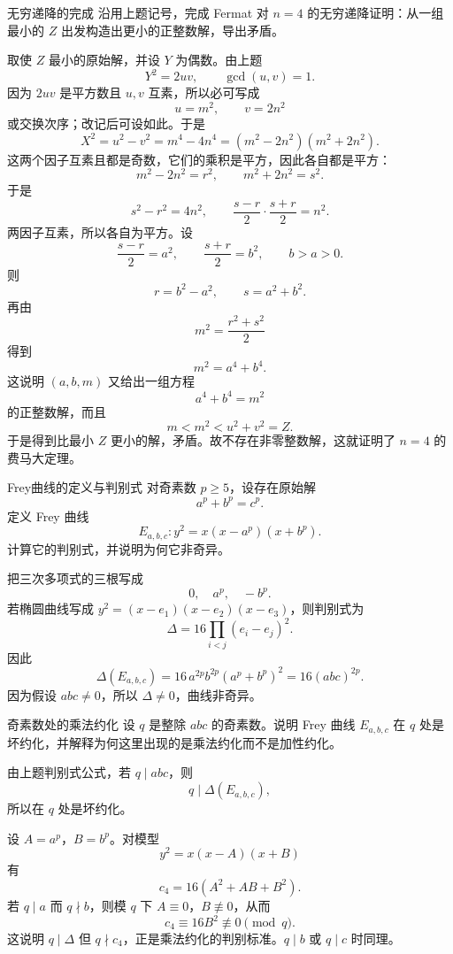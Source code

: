 \begin{problem}{无穷递降的完成}
\easy
沿用上题记号，完成 Fermat 对 $n=4$ 的无穷递降证明：从一组最小的 $Z$ 出发构造出更小的正整数解，导出矛盾。
\end{problem}
\begin{solution}
取使 $Z$ 最小的原始解，并设 $Y$ 为偶数。由上题
\[
Y^2=2uv,
\qquad \gcd(u,v)=1.
\]
因为 $2uv$ 是平方数且 $u,v$ 互素，所以必可写成
\[
u=m^2,
\qquad v=2n^2
\]
或交换次序；改记后可设如此。于是
\[
X^2=u^2-v^2=m^4-4n^4=(m^2-2n^2)(m^2+2n^2).
\]
这两个因子互素且都是奇数，它们的乘积是平方，因此各自都是平方：
\[
m^2-2n^2=r^2,
\qquad m^2+2n^2=s^2.
\]
于是
\[
s^2-r^2=4n^2,
\qquad
\frac{s-r}{2}\cdot \frac{s+r}{2}=n^2.
\]
两因子互素，所以各自为平方。设
\[
\frac{s-r}{2}=a^2,
\qquad
\frac{s+r}{2}=b^2,
\qquad b>a>0.
\]
则
\[
r=b^2-a^2,
\qquad s=a^2+b^2.
\]
再由
\[
m^2=\frac{r^2+s^2}{2}
\]
得到
\[
m^2=a^4+b^4.
\]
这说明 $(a,b,m)$ 又给出一组方程
\[
a^4+b^4=m^2
\]
的正整数解，而且
\[
m< m^2 < u^2+v^2=Z.
\]
于是得到比最小 $Z$ 更小的解，矛盾。故不存在非零整数解，这就证明了 $n=4$ 的费马大定理。
\end{solution}

\begin{problem}{Frey曲线的定义与判别式}
\easy
对奇素数 $p\ge5$，设存在原始解
\[
a^p+b^p=c^p.
\]
定义 Frey 曲线
\[
E_{a,b,c}:y^2=x(x-a^p)(x+b^p).
\]
计算它的判别式，并说明为何它非奇异。
\end{problem}
\begin{solution}
把三次多项式的三根写成
\[
0,\quad a^p,\quad -b^p.
\]
若椭圆曲线写成 $y^2=(x-e_1)(x-e_2)(x-e_3)$，则判别式为
\[
\Delta=16\prod_{i<j}(e_i-e_j)^2.
\]
因此
\[
\Delta(E_{a,b,c})=16\,a^{2p}b^{2p}(a^p+b^p)^{2}=16(a b c)^{2p}.
\]
因为假设 $abc\neq0$，所以 $\Delta\neq0$，曲线非奇异。
\end{solution}

\begin{problem}{奇素数处的乘法约化}
\easy
设 $q$ 是整除 $abc$ 的奇素数。说明 Frey 曲线 $E_{a,b,c}$ 在 $q$ 处是坏约化，并解释为何这里出现的是乘法约化而不是加性约化。
\end{problem}
\begin{solution}
由上题判别式公式，若 $q\mid abc$，则
\[
q\mid \Delta(E_{a,b,c}),
\]
所以在 $q$ 处是坏约化。

设 $A=a^p$，$B=b^p$。对模型
\[
y^2=x(x-A)(x+B)
\]
有
\[
c_4=16(A^2+AB+B^2).
\]
若 $q\mid a$ 而 $q\nmid b$，则模 $q$ 下 $A\equiv0$，$B\not\equiv0$，从而
\[
c_4\equiv16B^2\not\equiv0\pmod q.
\]
这说明 $q\mid\Delta$ 但 $q\nmid c_4$，正是乘法约化的判别标准。$q\mid b$ 或 $q\mid c$ 时同理。
\end{solution}

